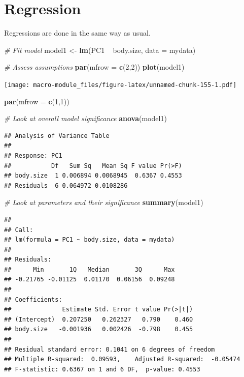 \documentclass[]{book}
\newenvironment{Shaded}{\begin{snugshade}}{\end{snugshade}}
\newcommand{\KeywordTok}[1]{\textcolor[rgb]{0.13,0.29,0.53}{\textbf{{#1}}}}
\newcommand{\DataTypeTok}[1]{\textcolor[rgb]{0.13,0.29,0.53}{{#1}}}
\newcommand{\DecValTok}[1]{\textcolor[rgb]{0.00,0.00,0.81}{{#1}}}
\newcommand{\StringTok}[1]{\textcolor[rgb]{0.31,0.60,0.02}{{#1}}}
\newcommand{\CommentTok}[1]{\textcolor[rgb]{0.56,0.35,0.01}{\textit{{#1}}}}
\newcommand{\NormalTok}[1]{{#1}}
\begin{document}
\section{Regression}\label{regression}

Regressions are done in the same way as usual.

\begin{Shaded}
\begin{Highlighting}[]
\CommentTok{# Fit model}
\NormalTok{model1 <-}\StringTok{ }\KeywordTok{lm}\NormalTok{(PC1 ~}\StringTok{ }\NormalTok{body.size, }\DataTypeTok{data =} \NormalTok{mydata)}

\CommentTok{# Assess assumptions}
\KeywordTok{par}\NormalTok{(}\DataTypeTok{mfrow =} \KeywordTok{c}\NormalTok{(}\DecValTok{2}\NormalTok{,}\DecValTok{2}\NormalTok{))}
\KeywordTok{plot}\NormalTok{(model1)}
\end{Highlighting}
\end{Shaded}

\texttt{[image: macro-module\_files/figure-latex/unnamed-chunk-155-1.pdf]}

\begin{Shaded}
\begin{Highlighting}[]
\KeywordTok{par}\NormalTok{(}\DataTypeTok{mfrow =} \KeywordTok{c}\NormalTok{(}\DecValTok{1}\NormalTok{,}\DecValTok{1}\NormalTok{))}

\CommentTok{# Look at overall model significance}
\KeywordTok{anova}\NormalTok{(model1)}
\end{Highlighting}
\end{Shaded}

\begin{verbatim}
## Analysis of Variance Table
## 
## Response: PC1
##           Df   Sum Sq   Mean Sq F value Pr(>F)
## body.size  1 0.006894 0.0068945  0.6367 0.4553
## Residuals  6 0.064972 0.0108286
\end{verbatim}

\begin{Shaded}
\begin{Highlighting}[]
\CommentTok{# Look at parameters and their significance}
\KeywordTok{summary}\NormalTok{(model1)}
\end{Highlighting}
\end{Shaded}

\begin{verbatim}
## 
## Call:
## lm(formula = PC1 ~ body.size, data = mydata)
## 
## Residuals:
##      Min       1Q   Median       3Q      Max 
## -0.21765 -0.01125  0.01170  0.06156  0.09248 
## 
## Coefficients:
##              Estimate Std. Error t value Pr(>|t|)
## (Intercept)  0.207250   0.262327   0.790    0.460
## body.size   -0.001936   0.002426  -0.798    0.455
## 
## Residual standard error: 0.1041 on 6 degrees of freedom
## Multiple R-squared:  0.09593,    Adjusted R-squared:  -0.05474 
## F-statistic: 0.6367 on 1 and 6 DF,  p-value: 0.4553
\end{verbatim}
\end{document}
